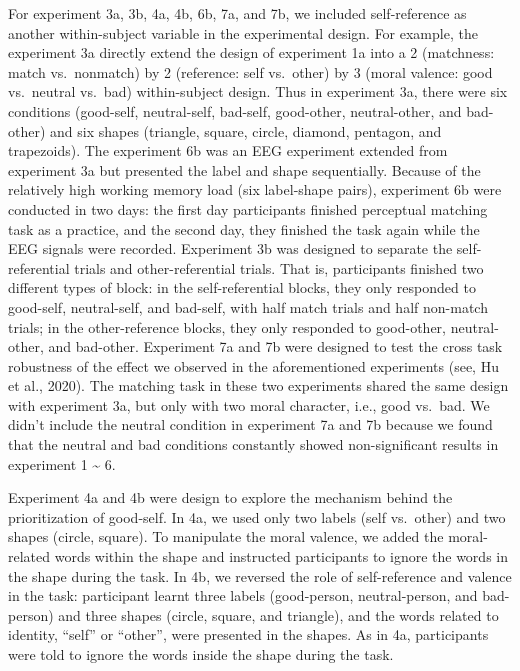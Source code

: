 \documentclass[
  english,
  man]{apa6}
\begin{document}
For experiment 3a, 3b, 4a, 4b, 6b, 7a, and 7b, we included self-reference as another within-subject variable in the experimental design. For example, the experiment 3a directly extend the design of experiment 1a into a 2 (matchness: match vs.~nonmatch) by 2 (reference: self vs.~other) by 3 (moral valence: good vs.~neutral vs.~bad) within-subject design. Thus in experiment 3a, there were six conditions (good-self, neutral-self, bad-self, good-other, neutral-other, and bad-other) and six shapes (triangle, square, circle, diamond, pentagon, and trapezoids). The experiment 6b was an EEG experiment extended from experiment 3a but presented the label and shape sequentially. Because of the relatively high working memory load (six label-shape pairs), experiment 6b were conducted in two days: the first day participants finished perceptual matching task as a practice, and the second day, they finished the task again while the EEG signals were recorded. Experiment 3b was designed to separate the self-referential trials and other-referential trials. That is, participants finished two different types of block: in the self-referential blocks, they only responded to good-self, neutral-self, and bad-self, with half match trials and half non-match trials; in the other-reference blocks, they only responded to good-other, neutral-other, and bad-other. Experiment 7a and 7b were designed to test the cross task robustness of the effect we observed in the aforementioned experiments (see, Hu et al., 2020). The matching task in these two experiments shared the same design with experiment 3a, but only with two moral character, i.e., good vs.~bad. We didn't include the neutral condition in experiment 7a and 7b because we found that the neutral and bad conditions constantly showed non-significant results in experiment 1 \textasciitilde{} 6.

Experiment 4a and 4b were design to explore the mechanism behind the prioritization of good-self. In 4a, we used only two labels (self vs.~other) and two shapes (circle, square). To manipulate the moral valence, we added the moral-related words within the shape and instructed participants to ignore the words in the shape during the task. In 4b, we reversed the role of self-reference and valence in the task: participant learnt three labels (good-person, neutral-person, and bad-person) and three shapes (circle, square, and triangle), and the words related to identity, \enquote{self} or \enquote{other}, were presented in the shapes. As in 4a, participants were told to ignore the words inside the shape during the task.
\end{document}
